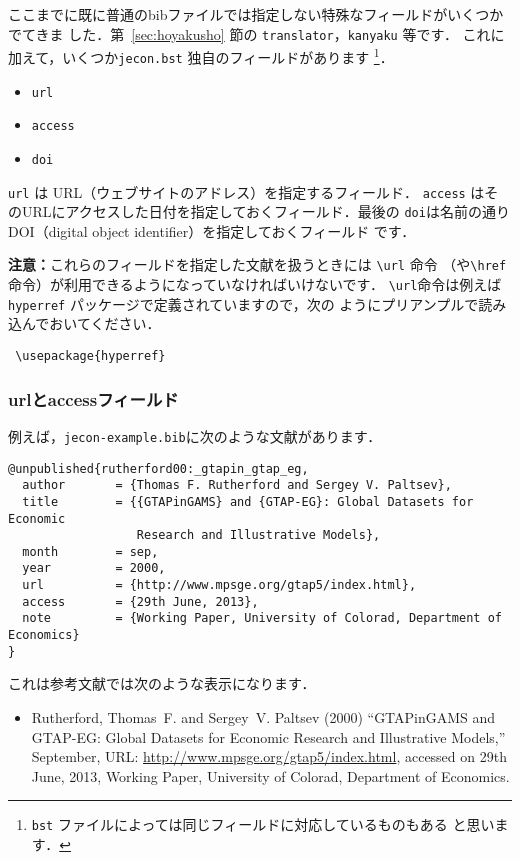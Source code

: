 \documentclass[article]{jlreq}
\begin{document}
ここまでに既に普通のbibファイルでは指定しない特殊なフィールドがいくつかでてきま
した．第~\ref{sec:hoyakusho} 節の \texttt{translator}，\texttt{kanyaku} 等です．
これに加えて，いくつか\texttt{jecon.bst} 独自のフィールドがあります
\footnote{\texttt{bst} ファイルによっては同じフィールドに対応しているものもある
と思います．}．
\begin{itemize}
 \item \texttt{url}
 \item \texttt{access}
 \item \texttt{doi}
\end{itemize}

\texttt{url} は URL（ウェブサイトのアドレス）を指定するフィールド．
\texttt{access} はそのURLにアクセスした日付を指定しておくフィールド．最後の
\texttt{doi}は名前の通りDOI（digital object identifier）を指定しておくフィールド
です．

\begin{screen}
 \textbf{注意：}これらのフィールドを指定した文献を扱うときには \verb|\url| 命令
 （や\verb|\href| 命令）が利用できるようになっていなければいけないです．
 \verb|\url|命令は例えば\texttt{hyperref} パッケージで定義されていますので，次の
 ようにプリアンプルで読み込んでおいてください．
\begin{verbatim}
 \usepackage{hyperref}
\end{verbatim} 
\end{screen}

\subsubsection{urlとaccessフィールド}

例えば，\texttt{jecon-example.bib}に次のような文献があります．
\begin{screen}
\begin{verbatim}
@unpublished{rutherford00:_gtapin_gtap_eg,
  author       = {Thomas F. Rutherford and Sergey V. Paltsev},
  title        = {{GTAPinGAMS} and {GTAP-EG}: Global Datasets for Economic
                  Research and Illustrative Models},
  month        = sep,
  year         = 2000,
  url          = {http://www.mpsge.org/gtap5/index.html},
  access       = {29th June, 2013},
  note         = {Working Paper, University of Colorad, Department of Economics}
}
\end{verbatim}
\end{screen}
これは参考文献では次のような表示になります．
\begin{screen}
 \begin{itemize}
  \item  Rutherford, Thomas~F. and Sergey~V. Paltsev (2000) ``{GTAPinGAMS} and
 {GTAP-EG}: Global Datasets for Economic Research and Illustrative Models,''
 September, URL: \url{http://www.mpsge.org/gtap5/index.html}, accessed on 29th
 June, 2013, Working Paper, University of Colorad, Department of Economics.
 \end{itemize}
\end{screen}
\end{document}
